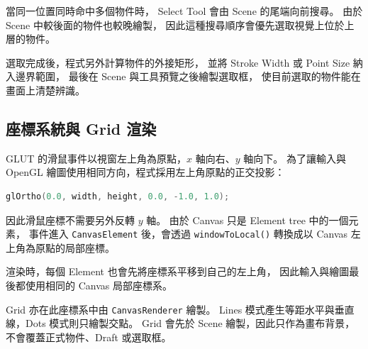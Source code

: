 當同一位置同時命中多個物件時，
Select Tool 會由 Scene 的尾端向前搜尋。
由於 Scene 中較後面的物件也較晚繪製，
因此這種搜尋順序會優先選取視覺上位於上層的物件。

選取完成後，程式另外計算物件的外接矩形，
並將 Stroke Width 或 Point Size 納入邊界範圍，
最後在 Scene 與工具預覽之後繪製選取框，
使目前選取的物件能在畫面上清楚辨識。


\subsection{座標系統與 Grid 渲染}

GLUT 的滑鼠事件以視窗左上角為原點，$x$ 軸向右、$y$ 軸向下。
為了讓輸入與 OpenGL 繪圖使用相同方向，程式採用左上角原點的正交投影：

\begin{lstlisting}[language=C++]
glOrtho(0.0, width, height, 0.0, -1.0, 1.0);
\end{lstlisting}

因此滑鼠座標不需要另外反轉 $y$ 軸。
由於 Canvas 只是 Element tree 中的一個元素，
事件進入 \lstinline|CanvasElement| 後，會透過
\lstinline|windowToLocal()| 轉換成以 Canvas 左上角為原點的局部座標。

渲染時，每個 Element 也會先將座標系平移到自己的左上角，
因此輸入與繪圖最後都使用相同的 Canvas 局部座標系。

Grid 亦在此座標系中由 \lstinline|CanvasRenderer| 繪製。
Lines 模式產生等距水平與垂直線，Dots 模式則只繪製交點。
Grid 會先於 Scene 繪製，因此只作為畫布背景，不會覆蓋正式物件、Draft 或選取框。
